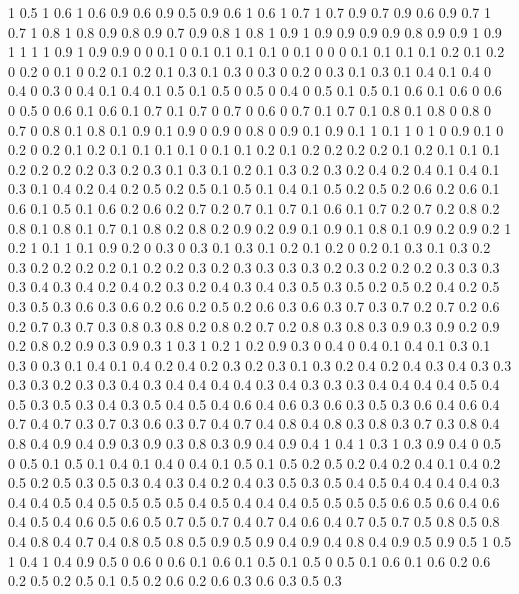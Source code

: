 1 0.5
1 0.6
1 0.6
0.9 0.6
0.9 0.5
0.9 0.6
1 0.6
1 0.7
1 0.7
0.9 0.7
0.9 0.6
0.9 0.7
1 0.7
1 0.8
1 0.8
0.9 0.8
0.9 0.7
0.9 0.8
1 0.8
1 0.9
1 0.9
0.9 0.9
0.9 0.8
0.9 0.9
1 0.9
1 1
1 1
0.9 1
0.9 0.9
0 0
0.1 0
0.1 0.1
0.1 0.1
0 0.1
0 0
0 0.1
0.1 0.1
0.1 0.2
0.1 0.2
0 0.2
0 0.1
0 0.2
0.1 0.2
0.1 0.3
0.1 0.3
0 0.3
0 0.2
0 0.3
0.1 0.3
0.1 0.4
0.1 0.4
0 0.4
0 0.3
0 0.4
0.1 0.4
0.1 0.5
0.1 0.5
0 0.5
0 0.4
0 0.5
0.1 0.5
0.1 0.6
0.1 0.6
0 0.6
0 0.5
0 0.6
0.1 0.6
0.1 0.7
0.1 0.7
0 0.7
0 0.6
0 0.7
0.1 0.7
0.1 0.8
0.1 0.8
0 0.8
0 0.7
0 0.8
0.1 0.8
0.1 0.9
0.1 0.9
0 0.9
0 0.8
0 0.9
0.1 0.9
0.1 1
0.1 1
0 1
0 0.9
0.1 0
0.2 0
0.2 0.1
0.2 0.1
0.1 0.1
0.1 0
0.1 0.1
0.2 0.1
0.2 0.2
0.2 0.2
0.1 0.2
0.1 0.1
0.1 0.2
0.2 0.2
0.2 0.3
0.2 0.3
0.1 0.3
0.1 0.2
0.1 0.3
0.2 0.3
0.2 0.4
0.2 0.4
0.1 0.4
0.1 0.3
0.1 0.4
0.2 0.4
0.2 0.5
0.2 0.5
0.1 0.5
0.1 0.4
0.1 0.5
0.2 0.5
0.2 0.6
0.2 0.6
0.1 0.6
0.1 0.5
0.1 0.6
0.2 0.6
0.2 0.7
0.2 0.7
0.1 0.7
0.1 0.6
0.1 0.7
0.2 0.7
0.2 0.8
0.2 0.8
0.1 0.8
0.1 0.7
0.1 0.8
0.2 0.8
0.2 0.9
0.2 0.9
0.1 0.9
0.1 0.8
0.1 0.9
0.2 0.9
0.2 1
0.2 1
0.1 1
0.1 0.9
0.2 0
0.3 0
0.3 0.1
0.3 0.1
0.2 0.1
0.2 0
0.2 0.1
0.3 0.1
0.3 0.2
0.3 0.2
0.2 0.2
0.2 0.1
0.2 0.2
0.3 0.2
0.3 0.3
0.3 0.3
0.2 0.3
0.2 0.2
0.2 0.3
0.3 0.3
0.3 0.4
0.3 0.4
0.2 0.4
0.2 0.3
0.2 0.4
0.3 0.4
0.3 0.5
0.3 0.5
0.2 0.5
0.2 0.4
0.2 0.5
0.3 0.5
0.3 0.6
0.3 0.6
0.2 0.6
0.2 0.5
0.2 0.6
0.3 0.6
0.3 0.7
0.3 0.7
0.2 0.7
0.2 0.6
0.2 0.7
0.3 0.7
0.3 0.8
0.3 0.8
0.2 0.8
0.2 0.7
0.2 0.8
0.3 0.8
0.3 0.9
0.3 0.9
0.2 0.9
0.2 0.8
0.2 0.9
0.3 0.9
0.3 1
0.3 1
0.2 1
0.2 0.9
0.3 0
0.4 0
0.4 0.1
0.4 0.1
0.3 0.1
0.3 0
0.3 0.1
0.4 0.1
0.4 0.2
0.4 0.2
0.3 0.2
0.3 0.1
0.3 0.2
0.4 0.2
0.4 0.3
0.4 0.3
0.3 0.3
0.3 0.2
0.3 0.3
0.4 0.3
0.4 0.4
0.4 0.4
0.3 0.4
0.3 0.3
0.3 0.4
0.4 0.4
0.4 0.5
0.4 0.5
0.3 0.5
0.3 0.4
0.3 0.5
0.4 0.5
0.4 0.6
0.4 0.6
0.3 0.6
0.3 0.5
0.3 0.6
0.4 0.6
0.4 0.7
0.4 0.7
0.3 0.7
0.3 0.6
0.3 0.7
0.4 0.7
0.4 0.8
0.4 0.8
0.3 0.8
0.3 0.7
0.3 0.8
0.4 0.8
0.4 0.9
0.4 0.9
0.3 0.9
0.3 0.8
0.3 0.9
0.4 0.9
0.4 1
0.4 1
0.3 1
0.3 0.9
0.4 0
0.5 0
0.5 0.1
0.5 0.1
0.4 0.1
0.4 0
0.4 0.1
0.5 0.1
0.5 0.2
0.5 0.2
0.4 0.2
0.4 0.1
0.4 0.2
0.5 0.2
0.5 0.3
0.5 0.3
0.4 0.3
0.4 0.2
0.4 0.3
0.5 0.3
0.5 0.4
0.5 0.4
0.4 0.4
0.4 0.3
0.4 0.4
0.5 0.4
0.5 0.5
0.5 0.5
0.4 0.5
0.4 0.4
0.4 0.5
0.5 0.5
0.5 0.6
0.5 0.6
0.4 0.6
0.4 0.5
0.4 0.6
0.5 0.6
0.5 0.7
0.5 0.7
0.4 0.7
0.4 0.6
0.4 0.7
0.5 0.7
0.5 0.8
0.5 0.8
0.4 0.8
0.4 0.7
0.4 0.8
0.5 0.8
0.5 0.9
0.5 0.9
0.4 0.9
0.4 0.8
0.4 0.9
0.5 0.9
0.5 1
0.5 1
0.4 1
0.4 0.9
0.5 0
0.6 0
0.6 0.1
0.6 0.1
0.5 0.1
0.5 0
0.5 0.1
0.6 0.1
0.6 0.2
0.6 0.2
0.5 0.2
0.5 0.1
0.5 0.2
0.6 0.2
0.6 0.3
0.6 0.3
0.5 0.3
